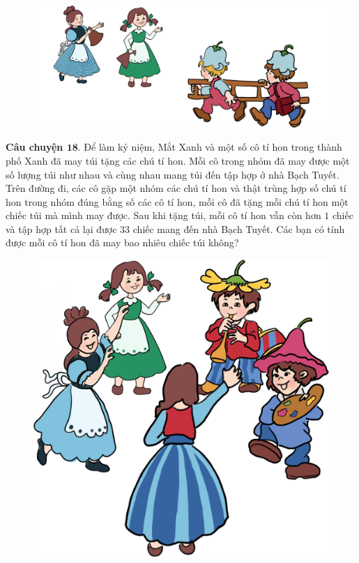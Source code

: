 	\begin{figure}
		\centering
		\vspace*{5pt}
		\captionsetup{labelformat= empty, justification=centering}
		\includegraphics[width=1\linewidth]{Hinh20_TangTui}
		\vspace*{-10pt}
	\end{figure}
	\textbf{\color{toancuabi}Câu chuyện $\pmb{18.}$} Để làm kỷ niệm, Mắt Xanh và một số cô tí hon trong thành phố Xanh đã may túi tặng các chú tí hon. Mỗi cô trong nhóm đã may được một số lượng túi như nhau và cùng nhau mang túi đến tập hợp ở nhà Bạch Tuyết. Trên đường đi, các cô gặp một nhóm các chú tí hon và thật trùng hợp số chú tí hon trong nhóm đúng bằng số các cô tí hon, mỗi cô đã tặng mỗi chú tí hon một chiếc túi mà mình may được. Sau khi tặng túi, mỗi cô tí hon vẫn còn hơn $1$ chiếc và tập hợp tất cả lại được $33$ chiếc mang đến nhà Bạch Tuyết. Các bạn có tính được mỗi cô tí hon đã may bao nhiêu chiếc túi không?
	\vskip 0.1cm
	\begin{figure}
		\centering
		\vspace*{-5pt}
		\captionsetup{labelformat= empty, justification=centering}
		\includegraphics[width=1\linewidth]{Hinh21_VongTron}
		\vspace*{-15pt}
	\end{figure}	
